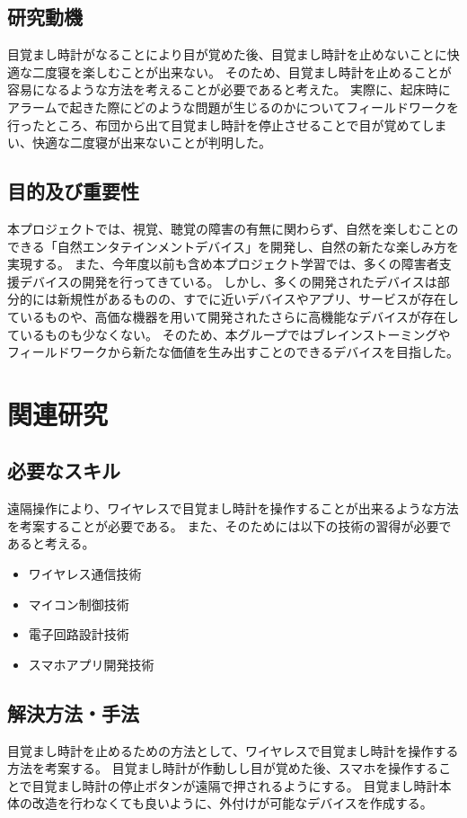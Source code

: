 \section{研究動機}
目覚まし時計がなることにより目が覚めた後、目覚まし時計を止めないことに快適な二度寝を楽しむことが出来ない。
そのため、目覚まし時計を止めることが容易になるような方法を考えることが必要であると考えた。
実際に、起床時にアラームで起きた際にどのような問題が生じるのかについてフィールドワークを行ったところ、布団から出て目覚まし時計を停止させることで目が覚めてしまい、快適な二度寝が出来ないことが判明した。

\section{目的及び重要性}
本プロジェクトでは、視覚、聴覚の障害の有無に関わらず、自然を楽しむことのできる「自然エンタテインメントデバイス」を開発し、自然の新たな楽しみ方を実現する。
また、今年度以前も含め本プロジェクト学習では、多くの障害者支援デバイスの開発を行ってきている。
しかし、多くの開発されたデバイスは部分的には新規性があるものの、すでに近いデバイスやアプリ、サービスが存在しているものや、高価な機器を用いて開発されたさらに高機能なデバイスが存在しているものも少なくない。
そのため、本グループではブレインストーミングやフィールドワークから新たな価値を生み出すことのできるデバイスを目指した。

\chapter{関連研究}
\section{必要なスキル}
遠隔操作により、ワイヤレスで目覚まし時計を操作することが出来るような方法を考案することが必要である。
また、そのためには以下の技術の習得が必要であると考える。
\begin{itemize}
    \item ワイヤレス通信技術
    \item マイコン制御技術
    \item 電子回路設計技術
    \item スマホアプリ開発技術
\end{itemize}

\section{解決方法・手法}
目覚まし時計を止めるための方法として、ワイヤレスで目覚まし時計を操作する方法を考案する。
目覚まし時計が作動しし目が覚めた後、スマホを操作することで目覚まし時計の停止ボタンが遠隔で押されるようにする。
目覚まし時計本体の改造を行わなくても良いように、外付けが可能なデバイスを作成する。


